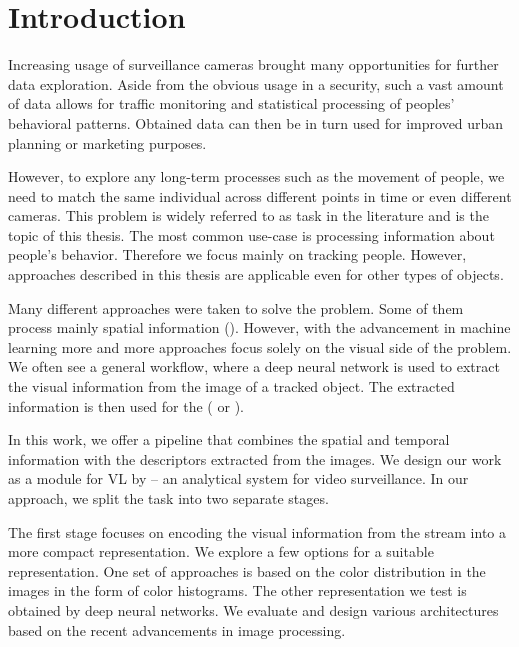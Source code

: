 \chapter*{Introduction}

\label{ch:intro}

Increasing usage of surveillance cameras brought many opportunities for further data exploration. Aside from the obvious usage in a security, such a vast amount of data allows for traffic monitoring and statistical processing of peoples' behavioral patterns. Obtained data can then be in turn used for improved urban planning or marketing purposes.

However, to explore any long-term processes such as the movement of people, we need to match the same individual across different points in time or even different cameras. This problem is widely referred to as \reid{} task in the literature and is the topic of this thesis. The most common use-case is processing information about people's behavior. Therefore we focus mainly on tracking people. However, approaches described in this thesis are applicable even for other types of objects.

Many different approaches were taken to solve the \reid{} problem. Some of them process mainly spatial information (\cite{hu2006principal}). However, with the advancement in machine learning more and more approaches focus solely on the visual side of the problem. We often see a general workflow, where a deep neural network is used to extract the visual information from the image of a tracked object. The extracted information is then used for the \reid{} (\cite{ding2015deep} or \cite{cheng2016person}).

In this work, we offer a \reid{} pipeline that combines the spatial and temporal information with the descriptors extracted from the images. We design our work as a module for \gls{VL} by \cite{videolytics} -- an analytical system for video surveillance. In our approach, we split the task into two separate stages.

The first stage focuses on encoding the visual information from the stream into a more compact representation. We explore a few options for a suitable representation. One set of approaches is based on the color distribution in the images in the form of color histograms. The other representation we test is obtained by deep neural networks. We evaluate and design various architectures based on the recent advancements in image processing.

